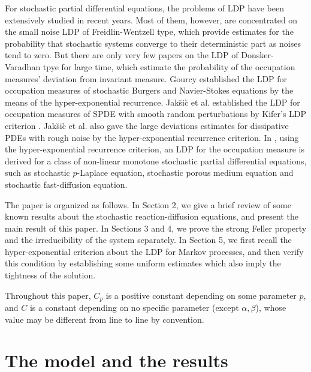 \documentclass[12pt,a4paper]{article}
\theoremstyle{definition}
\theoremstyle{remark}
\numberwithin{equation}{section}
\begin{document}
{\vskip0.3cm
For  stochastic partial differential equations,
the problems of  LDP have been extensively studied in recent years. Most of them, however, are concentrated on the small noise LDP of Freidlin-Wentzell type, which provide estimates for the probability that stochastic systems converge to their deterministic part as noises tend to zero.  But there are only very few papers on  the LDP of Donsker-Varadhan tpye for  large time, which  estimate   the probability  of the occupation measures'  deviation from invariant measure. Gourcy \cite{Gou1, Gou2}  established the LDP for occupation measures of stochastic Burgers and Navier-Stokes equations by the means of the hyper-exponential recurrence. Jak\u{s}i\`c et al. \cite{JNPS1} established the LDP for occupation measures of SPDE with smooth random perturbations by Kifer's LDP criterion \cite{Kif}. Jak\u{s}i\`c et al. \cite{JNPS2} also gave the large deviations estimates for dissipative PDEs with rough noise by the hyper-exponential recurrence criterion.
In \cite{WXX2}, using  the hyper-exponential recurrence criterion,  an LDP for the occupation measure  is derived for  a class of non-linear monotone stochastic partial differential equations, such as   stochastic $p$-Laplace equation,  stochastic porous medium equation and stochastic fast-diffusion equation.
\vskip0.3cm




\vskip0.3cm

The paper is organized as follows. In Section 2, we  give a brief review of some known results about  the   stochastic reaction-diffusion equations, and present the main result of this paper. In Sections 3 and 4, we prove the strong Feller property  and the irreducibility of the system separately. In Section 5, we first  recall the hyper-exponential criterion about the LDP for Markov processes, and then verify this condition by establishing some uniform estimates which also imply the tightness of the solution.

\vskip0.3cm

Throughout this paper, $C_p$ is a positive constant depending on some parameter $p$, and $C$ is a constant depending on no  specific parameter (except $\alpha, \beta$), whose value  may be different from line to line by convention.


\section{The model and the results}

}
\end{document}
